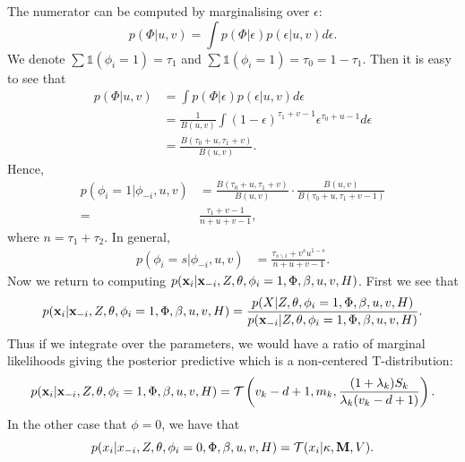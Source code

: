 \documentclass[12pt,english]{article}\usepackage[]{graphicx}\usepackage[]{color}
\begin{document}
The numerator can be computed by marginalising over $\epsilon$:
\begin{equation}
p(\Phi|u,v) = \int p(\Phi | \epsilon)p(\epsilon|u,v) d\epsilon.
\end{equation}
We denote $\sum\mathds{1}(\phi_i = 1) = \tau_1$ and $\sum\mathds{1}(\phi_i = 1) = \tau_0 = 1 -\tau_1$. Then it is easy to see that
\begin{equation}
\begin{split}
p(\Phi|u,v) & = \int p(\Phi | \epsilon)p(\epsilon|u,v) d\epsilon\\
& = \frac{1}{B(u,v)}\int (1-\epsilon)^{\tau_1 + v - 1}\epsilon^{\tau_0 + u - 1} d\epsilon\\
& = \frac{B(\tau_0 + u,\tau_1 + v)}{B(u,v)}.
\end{split}
\end{equation}
Hence,
\begin{equation}
\begin{split}
p(\phi_i=1|\phi_{-i},u,v) &= \frac{B(\tau_0 + u,\tau_1 + v)}{B(u,v)} \cdot \frac{B(u,v)}{B(\tau_0 + u,\tau_1 + v -1)}\\
= & \frac{\tau_1 + v - 1}{n+u+v-1},
\end{split}
\end{equation}
where $n = \tau_1 + \tau_2$. In general,
\begin{equation}
\begin{split}
p(\phi_i=s|\phi_{-i},u,v) &=  \frac{\tau_{s\backslash i} + v^{s}u^{1-s}}{n+u+v-1}.
\end{split}
\end{equation}
Now we return to computing $p({\bf x}_i|{\bf x}_{-i},Z,\theta, \phi_i =1, \Phi, \beta, u,v, H)$. First we see that
\begin{equation}
p({\bf x}_i|{\bf x}_{-i},Z,\theta, \phi_i =1, \Phi, \beta, u,v, H)= \frac{p(X|Z,\theta, \phi_i =1, \Phi, \beta, u,v, H)}{p({\bf x}_{-i}|Z,\theta, \phi_i =1, \Phi, \beta, u,v, H)}.
\end{equation}
Thus if we integrate over the parameters, we would have a ratio of marginal likelihoods giving the posterior predictive which is a non-centered T-distribution:
\begin{equation}
p({\bf x}_i|{\bf x}_{-i},Z,\theta, \phi_i =1, \Phi, \beta, u,v, H) = \mathcal{T}\left( v_k - d + 1, m_k, \frac{(1+\lambda_k)S_k}{\lambda_k (v_k - d + 1)} \right).
\end{equation}
In the other case that $\phi = 0$, we have that
\begin{equation}
p(x_i|x_{-i},Z,\theta, \phi_i =0, \Phi, \beta, u,v, H) = \mathcal{T}(x_i|\kappa, {\bf M}, V).
\end{equation}
\end{document}
